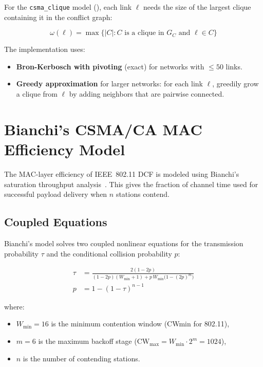 \documentclass[11pt,letterpaper]{article}
\begin{document}
For the \texttt{csma\_clique} model (), each link
$\ell$ needs the size of the largest clique containing it in the conflict
graph:

\begin{equation}
\omega(\ell) = \max\bigl\{|C| : C \text{ is a clique in } G_C \text{ and } \ell \in C\bigr\}
\end{equation}

The implementation uses:
\begin{itemize}[itemsep=2pt]
\item \textbf{Bron-Kerbosch with pivoting} (exact) for networks with $\leq 50$ links.
\item \textbf{Greedy approximation} for larger networks: for each link $\ell$,
  greedily grow a clique from $\ell$ by adding neighbors that are pairwise
  connected.
\end{itemize}

\section{Bianchi's CSMA/CA MAC Efficiency Model}
\label{sec:bianchi}

The MAC-layer efficiency of IEEE~802.11 DCF is modeled using Bianchi's
saturation throughput analysis~\cite{bianchi2000}.  This gives the fraction
of channel time used for successful payload delivery when $n$ stations
contend.

\subsection{Coupled Equations}

Bianchi's model solves two coupled nonlinear equations for the transmission
probability $\tau$ and the conditional collision probability $p$:

\begin{align}
\tau &= \frac{2(1 - 2p)}{(1 - 2p)(W_{\min} + 1) + p\,W_{\min}\bigl(1 - (2p)^m\bigr)}
  \label{eq:bianchi_tau} \\
p    &= 1 - (1 - \tau)^{n-1}
  \label{eq:bianchi_p}
\end{align}

where:
\begin{itemize}[itemsep=2pt]
\item $W_{\min} = 16$ is the minimum contention window (CWmin for 802.11),
\item $m = 6$ is the maximum backoff stage ($\text{CW}_\text{max} = W_{\min} \cdot 2^m = 1024$),
\item $n$ is the number of contending stations.
\end{itemize}
\end{document}
